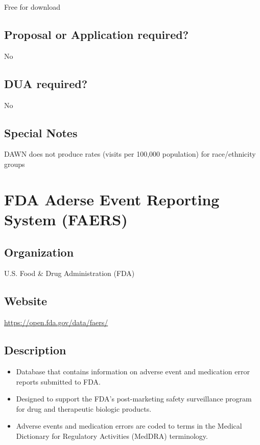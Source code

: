 \documentclass[
]{book}
\providecommand{\tightlist}{%
  \setlength{\itemsep}{0pt}\setlength{\parskip}{0pt}}
\begin{document}
Free for download

\hypertarget{proposal-or-application-required-24}{%
\section{Proposal or Application required?}\label{proposal-or-application-required-24}}

No

\hypertarget{dua-required-24}{%
\section{DUA required?}\label{dua-required-24}}

No

\hypertarget{special-notes-24}{%
\section{Special Notes}\label{special-notes-24}}

DAWN does not produce rates (visits per 100,000 population) for race/ethnicity groups

\mainmatter

\hypertarget{fda-aderse-event-reporting-system-faers}{%
\chapter{FDA Aderse Event Reporting System (FAERS)}\label{fda-aderse-event-reporting-system-faers}}

\hypertarget{organization-25}{%
\section{Organization}\label{organization-25}}

U.S. Food \& Drug Administration (FDA)

\hypertarget{website-25}{%
\section{Website}\label{website-25}}

\url{https://open.fda.gov/data/faers/}

\hypertarget{description-25}{%
\section{Description}\label{description-25}}

\begin{itemize}
\tightlist
\item
  Database that contains information on adverse event and medication error reports submitted to FDA.
\item
  Designed to support the FDA's post-marketing safety surveillance program for drug and therapeutic biologic products.
\item
  Adverse events and medication errors are coded to terms in the Medical Dictionary for Regulatory Activities (MedDRA) terminology.
\end{itemize}
\end{document}
